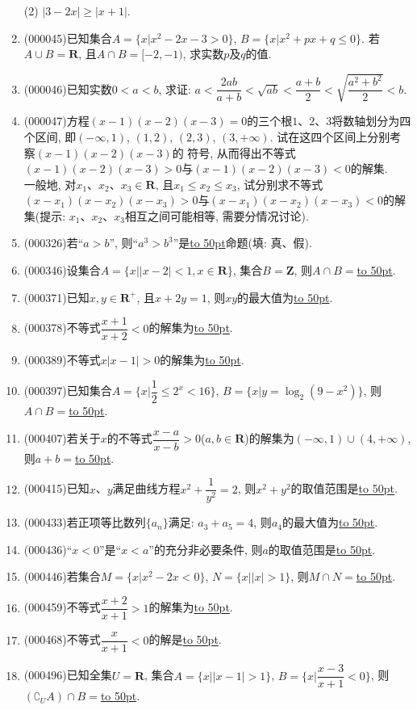 \documentclass[10pt,a4paper]{article}
\newcommand{\blank}[1]{\underline{\hbox to #1pt{}}}
\begin{document}
\begin{enumerate}[1.]
(2) $|3-2x| \ge |x+1|$.
\item {\tiny (000045)}已知集合$A=\{x|x^2-2x-3>0\}$, $B=\{x|x^2+px+q\le 0\}$. 若$A\cup B=\mathbf{R}$, 且$A\cap B=[-2,-1)$, 求实数$p$及$q$的值.
\item {\tiny (000046)}已知实数$0<a<b$, 求证: $a<\dfrac{2ab}{a+b}<\sqrt{ab}<\dfrac{a+b}{2}<\sqrt{\dfrac{a^2+b^2}{2}}<b$.
\item {\tiny (000047)}方程$(x-1)(x-2)(x-3)=0$的三个根$1$、$2$、$3$将数轴划分为四个区间, 即$(-\infty, 1)$, $(1, 2)$, $(2, 3)$, $(3, +\infty)$. 试在这四个区间上分别考察$(x-1)(x-2)(x-3)$的
符号, 从而得出不等式$(x-1)(x-2)(x-3)>0$与$(x-1)(x-2)(x-3)<0$的解集.\\
一般地, 对$x_1$、$x_2$、$x_3\in \mathbf{R}$, 且$x_1\le x_2\le x_3$, 试分别求不等式$(x-x_1)(x-x_2)(x-x_3)>0$与$(x-x_1)(x-x_2)(x-x_3)<0$的解集(提示: $x_1$、$x_2$、$x_3$相互之间可能相等, 需要分情况讨论).
\item {\tiny (000326)}若``$a>b$'', 则``$a^3>b^3$''是\blank{50}命题(填: 真、假).
\item {\tiny (000346)}设集合$A=\{x||x-2|<1,x\in \mathbf{R}\}$, 集合$B=\mathbf{Z}$, 则$A\cap B=$\blank{50}.
\item {\tiny (000371)}已知$x,y\in \mathbf{R}^+$, 且$x+2y=1$, 则$xy$的最大值为\blank{50}.
\item {\tiny (000378)}不等式$\dfrac{x+1}{x+2}<0$的解集为\blank{50}.
\item {\tiny (000389)}不等式$x|x-1|>0$的解集为\blank{50}.
\item {\tiny (000397)}已知集合$A=\{x|\dfrac12\le {2^x}<16\}$, $B=\{x|y=\log _2(9-x^2)\}$, 则$A\cap B=$\blank{50}.
\item {\tiny (000407)}若关于$x$的不等式$\dfrac{x-a}{x-b}>0$($a,b\in \mathbf{R}$)的解集为$(-\infty ,1)\cup (4,+\infty)$, 则$a+b=$\blank{50}.
\item {\tiny (000415)}已知$x$、$y$满足曲线方程$x^2+\dfrac1{y^2}=2$, 则$x^2+y^2$的取值范围是\blank{50}.
\item {\tiny (000433)}若正项等比数列$\{a_n\}$满足: $a_3+a_5=4$, 则$a_4$的最大值为\blank{50}.
\item {\tiny (000436)}``$x<0$''是``$x<a$''的充分非必要条件, 则$a$的取值范围是\blank{50}.
\item {\tiny (000446)}若集合$M=\{x|{x^2}-2x<0\}$, $N=\{x||x|>1\}$, 则$M\cap N=$\blank{50}.
\item {\tiny (000459)}不等式$\dfrac{x+2}{x+1}>1$的解集为\blank{50}.
\item {\tiny (000468)}不等式$\dfrac x{x+1}<0$的解是\blank{50}.
\item {\tiny (000496)}已知全集$U=\mathbf{R}$, 集合$A=\{x||x-1|>1\}$, $B=\{x|\dfrac{x-3}{x+1}<0\}$, 则$(\complement_U A)\cap B=$\blank{50}.

\end{enumerate}
\end{document}
